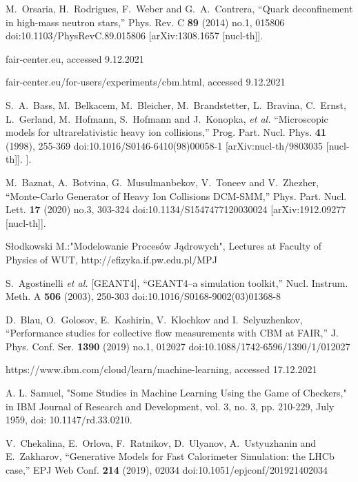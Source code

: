 \begin{thebibliography}{99}
    M.~Orsaria, H.~Rodrigues, F.~Weber and G.~A.~Contrera,
    ``Quark deconfinement in high-mass neutron stars,''
    Phys. Rev. C \textbf{89} (2014) no.1, 015806
    doi:10.1103/PhysRevC.89.015806
    [arXiv:1308.1657 [nucl-th]].
    
    fair-center.eu, accessed 9.12.2021
    
    fair-center.eu/for-users/experiments/cbm.html, accessed 9.12.2021
    
   S.~A.~Bass, M.~Belkacem, M.~Bleicher, M.~Brandstetter, L.~Bravina, C.~Ernst, L.~Gerland, M.~Hofmann, S.~Hofmann and J.~Konopka, \textit{et al.}
    ``Microscopic models for ultrarelativistic heavy ion collisions,''
    Prog. Part. Nucl. Phys. \textbf{41} (1998), 255-369
    doi:10.1016/S0146-6410(98)00058-1
    [arXiv:nucl-th/9803035 [nucl-th]].
    ].
    
    M.~Baznat, A.~Botvina, G.~Musulmanbekov, V.~Toneev and V.~Zhezher,
    ``Monte-Carlo Generator of Heavy Ion Collisions DCM-SMM,''
    Phys. Part. Nucl. Lett. \textbf{17} (2020) no.3, 303-324
    doi:10.1134/S1547477120030024
    [arXiv:1912.09277 [nucl-th]].
    
    Słodkowski M.:"Modelowanie Procesów Jądrowych", Lectures at Faculty of Physics of WUT, http://efizyka.if.pw.edu.pl/MPJ
    
    
    S.~Agostinelli \textit{et al.} [GEANT4],
    ``GEANT4--a simulation toolkit,''
    Nucl. Instrum. Meth. A \textbf{506} (2003), 250-303
    doi:10.1016/S0168-9002(03)01368-8
    
    D.~Blau, O.~Golosov, E.~Kashirin, V.~Klochkov and I.~Selyuzhenkov,
    ``Performance studies for collective flow measurements with CBM at FAIR,''
    J. Phys. Conf. Ser. \textbf{1390} (2019) no.1, 012027
    doi:10.1088/1742-6596/1390/1/012027
    
    https://www.ibm.com/cloud/learn/machine-learning, accessed 17.12.2021
    
    A. L. Samuel, "Some Studies in Machine Learning Using the Game of Checkers," in IBM Journal of Research and Development, vol. 3, no. 3, pp. 210-229, July 1959, doi: 10.1147/rd.33.0210.
    
    V.~Chekalina, E.~Orlova, F.~Ratnikov, D.~Ulyanov, A.~Ustyuzhanin and E.~Zakharov,
    ``Generative Models for Fast Calorimeter Simulation: the LHCb case,''
    EPJ Web Conf. \textbf{214} (2019), 02034
    doi:10.1051/epjconf/201921402034
    

\end{thebibliography}
